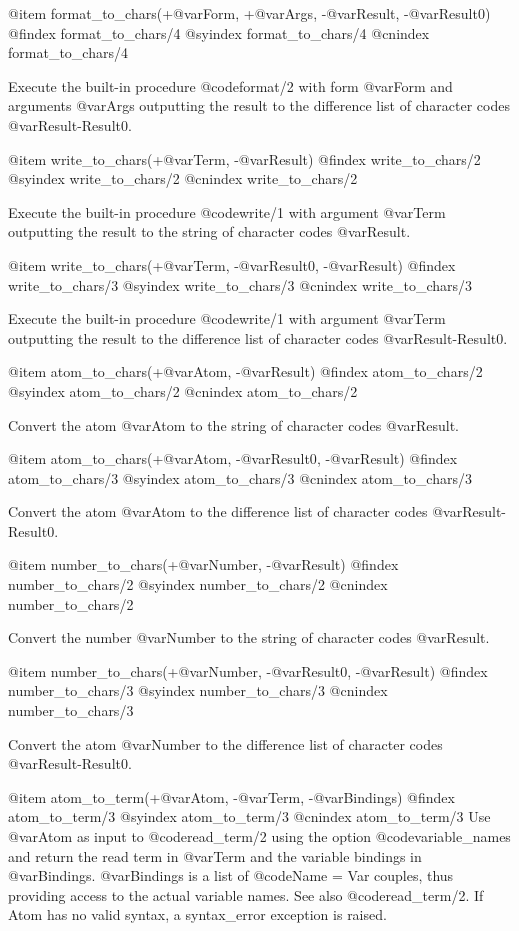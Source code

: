 {{{{{{{{{@item format_to_chars(+@var{Form}, +@var{Args}, -@var{Result}, -@var{Result0})
@findex format_to_chars/4
@syindex format_to_chars/4
@cnindex format_to_chars/4

Execute the built-in procedure @code{format/2} with form @var{Form} and
arguments @var{Args} outputting the result to the difference list of
character codes @var{Result-Result0}.

@item write_to_chars(+@var{Term}, -@var{Result})
@findex write_to_chars/2
@syindex write_to_chars/2
@cnindex write_to_chars/2

Execute the built-in procedure @code{write/1} with argument @var{Term}
outputting the result to the string of character codes @var{Result}.

@item write_to_chars(+@var{Term}, -@var{Result0}, -@var{Result})
@findex write_to_chars/3
@syindex write_to_chars/3
@cnindex write_to_chars/3

Execute the built-in procedure @code{write/1} with argument @var{Term}
outputting the result to the difference list of character codes
@var{Result-Result0}.

@item atom_to_chars(+@var{Atom}, -@var{Result})
@findex atom_to_chars/2
@syindex atom_to_chars/2
@cnindex atom_to_chars/2

Convert the atom @var{Atom} to the string of character codes
@var{Result}.

@item atom_to_chars(+@var{Atom}, -@var{Result0}, -@var{Result})
@findex atom_to_chars/3
@syindex atom_to_chars/3
@cnindex atom_to_chars/3

Convert the atom @var{Atom} to the difference list of character codes
@var{Result-Result0}.

@item number_to_chars(+@var{Number}, -@var{Result})
@findex number_to_chars/2
@syindex number_to_chars/2
@cnindex number_to_chars/2

Convert the number @var{Number} to the string of character codes
@var{Result}.

@item number_to_chars(+@var{Number}, -@var{Result0}, -@var{Result})
@findex number_to_chars/3
@syindex number_to_chars/3
@cnindex number_to_chars/3

Convert the atom @var{Number} to the difference list of character codes
@var{Result-Result0}.

@item atom_to_term(+@var{Atom}, -@var{Term}, -@var{Bindings})
@findex atom_to_term/3
@syindex atom_to_term/3
@cnindex atom_to_term/3
Use @var{Atom} as input to @code{read_term/2} using the option @code{variable_names} and return the read term in @var{Term} and the variable bindings in @var{Bindings}. @var{Bindings} is a list of @code{Name = Var} couples, thus providing access to the actual variable names. See also @code{read_term/2}. If Atom has no valid syntax, a syntax_error exception is raised.

}}}}}}}}}
